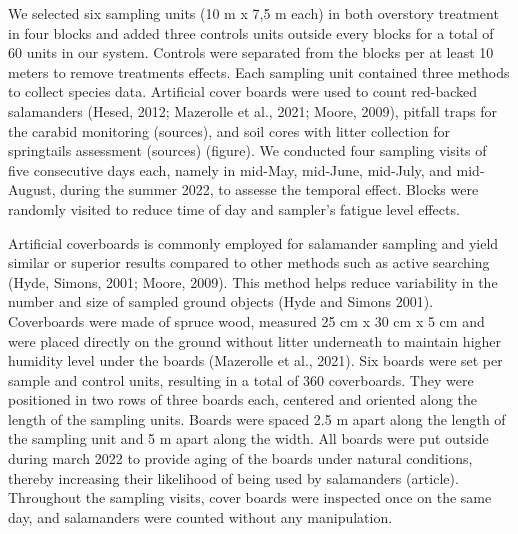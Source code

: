 We selected six sampling units (10 m x 7,5 m each) in both overstory treatment in four blocks and added three controls units outside every blocks for a total of 60 units in our system. 
Controls were separated from the blocks per at least 10 meters to remove treatments effects.
Each sampling unit contained three methods to collect species data. 
Artificial cover boards were used to count red-backed salamanders (Hesed, 2012; Mazerolle et al., 2021; Moore, 2009), 
pitfall traps for the carabid monitoring (sources), and soil cores with litter collection for springtails assessment (sources) (figure).
We conducted four sampling visits of five consecutive days each, namely in mid-May, mid-June, mid-July, and mid-August, during the summer 2022, to assesse the temporal effect. 
Blocks were randomly visited to reduce time of day and sampler's fatigue level effects.

Artificial coverboards is commonly employed for salamander sampling and yield similar or superior results compared to other methods such as active searching (Hyde, Simons, 2001; Moore, 2009). 
This method helps reduce variability in the number and size of sampled ground objects (Hyde and Simons 2001). 
Coverboards were made of spruce wood, measured 25 cm x 30 cm x 5 cm and were placed directly on the ground without litter underneath to maintain higher humidity level under the boards (Mazerolle et al., 2021). 
Six boards were set per sample and control units, resulting in a total of 360 coverboards.
They were positioned in two rows of three boards each, centered and oriented along the length of the sampling units.
Boards were spaced 2.5 m apart along the length of the sampling unit and 5 m apart along the width.
All boards were put outside during march 2022 to provide aging of the boards under natural conditions, thereby increasing their likelihood of being used by salamanders (article).
Throughout the sampling visits, cover boards were inspected once on the same day, and salamanders were counted without any manipulation.

